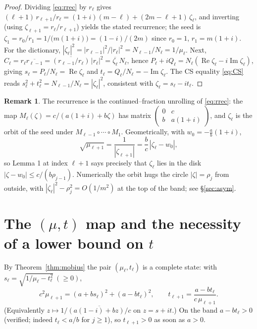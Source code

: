 \documentclass[11pt]{article}
\theoremstyle{definition}
\newtheorem{remark}{Remark}
\newcommand{\Re}{\operatorname{Re}}
\newcommand{\Im}{\operatorname{Im}}
\begin{document}
\begin{proof}
Dividing \eqref{eq:rrec} by $r_\ell$ gives
$(\ell+1)\,r_{\ell+1}/r_\ell=(1+i)(m-\ell)+(2m-\ell+1)\,\zeta_\ell$, and inverting
(using $\zeta_{\ell+1}=r_\ell/r_{\ell+1}$) yields the stated recurrence; the seed
is $\zeta_1=r_0/r_1=1/\big(m(1+i)\big)=(1-i)/(2m)$ since $r_0=1$, $r_1=m(1+i)$.
For the dictionary, $|\zeta_\ell|^2=|r_{\ell-1}|^2/|r_\ell|^2=N_{\ell-1}/N_\ell
=1/\mu_\ell$. Next,
$C_\ell=r_\ell\overline{r_{\ell-1}}=\overline{(r_{\ell-1}/r_\ell)}\,|r_\ell|^2
=\overline{\zeta_\ell}\,N_\ell$, hence
$P_\ell+iQ_\ell=N_\ell(\Re\zeta_\ell-i\Im\zeta_\ell)$, giving
$s_\ell=P_\ell/N_\ell=\Re\zeta_\ell$ and $t_\ell=Q_\ell/N_\ell=-\Im\zeta_\ell$.
The CS equality \eqref{eq:CS} reads $s_\ell^2+t_\ell^2=N_{\ell-1}/N_\ell
=|\zeta_\ell|^2$, consistent with $\zeta_\ell=s_\ell-it_\ell$.
\end{proof}

\begin{remark}
The recurrence is the continued--fraction unrolling of \eqref{eq:rrec}: the
map $M_\ell(\zeta)=c/(a(1+i)+b\zeta)$ has matrix
$\left(\begin{smallmatrix}0&c\\ b&a(1+i)\end{smallmatrix}\right)$, and
$\zeta_\ell$ is the orbit of the seed under
$M_{\ell-1}\circ\cdots\circ M_1$. Geometrically, with $w_0=-\tfrac{a}{b}(1+i)$,
\[
\sqrt{\mu_{\ell+1}}=\frac{1}{|\zeta_{\ell+1}|}=\frac{b}{c}\,|\zeta_\ell-w_0|,
\]
so Lemma 1 at index $\ell+1$ says precisely that $\zeta_\ell$ lies in the disk
$|\zeta-w_0|\le c/(b\rho_{j-1})$. Numerically the orbit hugs the circle
$|\zeta|=\rho_j$ from outside, with $|\zeta_\ell|^2-\rho_j^2=O(1/m^2)$ at the top
of the band; see \S\ref{sec:asym}.
\end{remark}

\section{The $(\mu,t)$ map and the necessity of a lower bound on $t$}

By Theorem~\ref{thm:mobius} the pair $(\mu_\ell,t_\ell)$ is a complete state:
with $s_\ell=\sqrt{1/\mu_\ell-t_\ell^2}\ (\ge 0)$,
\begin{equation}\label{eq:mut}
c^2\mu_{\ell+1}=(a+b s_\ell)^2+(a-b t_\ell)^2,\qquad
t_{\ell+1}=\frac{a-b t_\ell}{c\,\mu_{\ell+1}} .
\end{equation}
(Equivalently $z\mapsto 1/\overline{(a(1-i)+bz)/c}$ on $z=s+it$.) On the band
$a-bt_\ell>0$ (verified; indeed $t_\ell<a/b$ for $j\ge1$), so $t_{\ell+1}>0$ as
soon as $a>0$.
\end{document}
